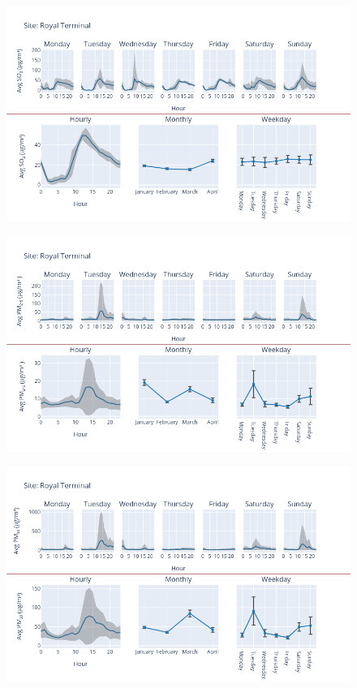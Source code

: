 \documentclass[12pt, oneside]{book}
\begin{document}
{ 
{\begin{figure}[H] 
 \centering 
\includegraphics[width=.88\textwidth, keepaspectratio]{image137} 
 \end{figure}}{} 

{\begin{figure}[H] 
 \centering 
\includegraphics[width=.88\textwidth, keepaspectratio]{image138} 
 \end{figure}}{} 

{\begin{figure}[H] 
 \centering 
\includegraphics[width=.88\textwidth, keepaspectratio]{image139} 
 \end{figure}}{} 

}
\end{document}
